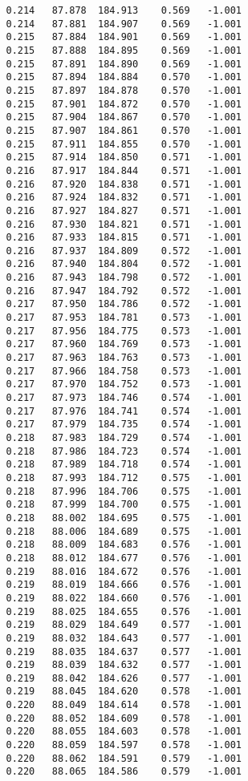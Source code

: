 \begin{verbatim}
   0.214   87.878  184.913    0.569   -1.001
   0.214   87.881  184.907    0.569   -1.001
   0.215   87.884  184.901    0.569   -1.001
   0.215   87.888  184.895    0.569   -1.001
   0.215   87.891  184.890    0.569   -1.001
   0.215   87.894  184.884    0.570   -1.001
   0.215   87.897  184.878    0.570   -1.001
   0.215   87.901  184.872    0.570   -1.001
   0.215   87.904  184.867    0.570   -1.001
   0.215   87.907  184.861    0.570   -1.001
   0.215   87.911  184.855    0.570   -1.001
   0.215   87.914  184.850    0.571   -1.001
   0.216   87.917  184.844    0.571   -1.001
   0.216   87.920  184.838    0.571   -1.001
   0.216   87.924  184.832    0.571   -1.001
   0.216   87.927  184.827    0.571   -1.001
   0.216   87.930  184.821    0.571   -1.001
   0.216   87.933  184.815    0.571   -1.001
   0.216   87.937  184.809    0.572   -1.001
   0.216   87.940  184.804    0.572   -1.001
   0.216   87.943  184.798    0.572   -1.001
   0.216   87.947  184.792    0.572   -1.001
   0.217   87.950  184.786    0.572   -1.001
   0.217   87.953  184.781    0.573   -1.001
   0.217   87.956  184.775    0.573   -1.001
   0.217   87.960  184.769    0.573   -1.001
   0.217   87.963  184.763    0.573   -1.001
   0.217   87.966  184.758    0.573   -1.001
   0.217   87.970  184.752    0.573   -1.001
   0.217   87.973  184.746    0.574   -1.001
   0.217   87.976  184.741    0.574   -1.001
   0.217   87.979  184.735    0.574   -1.001
   0.218   87.983  184.729    0.574   -1.001
   0.218   87.986  184.723    0.574   -1.001
   0.218   87.989  184.718    0.574   -1.001
   0.218   87.993  184.712    0.575   -1.001
   0.218   87.996  184.706    0.575   -1.001
   0.218   87.999  184.700    0.575   -1.001
   0.218   88.002  184.695    0.575   -1.001
   0.218   88.006  184.689    0.575   -1.001
   0.218   88.009  184.683    0.576   -1.001
   0.218   88.012  184.677    0.576   -1.001
   0.219   88.016  184.672    0.576   -1.001
   0.219   88.019  184.666    0.576   -1.001
   0.219   88.022  184.660    0.576   -1.001
   0.219   88.025  184.655    0.576   -1.001
   0.219   88.029  184.649    0.577   -1.001
   0.219   88.032  184.643    0.577   -1.001
   0.219   88.035  184.637    0.577   -1.001
   0.219   88.039  184.632    0.577   -1.001
   0.219   88.042  184.626    0.577   -1.001
   0.219   88.045  184.620    0.578   -1.001
   0.220   88.049  184.614    0.578   -1.001
   0.220   88.052  184.609    0.578   -1.001
   0.220   88.055  184.603    0.578   -1.001
   0.220   88.059  184.597    0.578   -1.001
   0.220   88.062  184.591    0.579   -1.001
   0.220   88.065  184.586    0.579   -1.001

\end{verbatim}
